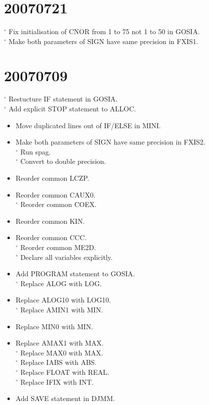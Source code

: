 \documentclass[10pt]{article}
\begin{document}
\section*{20070721}
${ }^{\circ}$ Fix initialisation of CNOR from 1 to 75 not 1 to 50 in GOSIA.\\
${ }^{\circ}$ Make both parameters of SIGN have same precision in FXIS1.

\section*{20070709}
${ }^{\circ}$ Restucture IF statement in GOSIA.\\
${ }^{\circ}$ Add explicit STOP statement to ALLOC.

\begin{itemize}
  \item Move duplicated lines out of IF/ELSE in MINI.
  \item Make both parameters of SIGN have same precision in FXIS2.\\
${ }^{\circ}$ Run spag.\\
${ }^{\circ}$ Convert to double precision.
  \item Reorder common LCZP.
  \item Reorder common CAUX0.\\
${ }^{\circ}$ Reorder common COEX.
  \item Reorder common KIN.
  \item Reorder common CCC.\\
${ }^{\circ}$ Reorder common ME2D.\\
${ }^{\circ}$ Declare all variables explicitly.
  \item Add PROGRAM statement to GOSIA.\\
${ }^{\circ}$ Replace ALOG with LOG.
  \item Replace ALOG10 with LOG10.\\
${ }^{\circ}$ Replace AMIN1 with MIN.
  \item Replace MIN0 with MIN.
  \item Replace AMAX1 with MAX.\\
${ }^{\circ}$ Replace MAX0 with MAX.\\
${ }^{\circ}$ Replace IABS with ABS.\\
${ }^{\circ}$ Replace FLOAT with REAL.\\
${ }^{\circ}$ Replace IFIX with INT.
  \item Add SAVE statement in DJMM.
\end{itemize}
\end{document}
